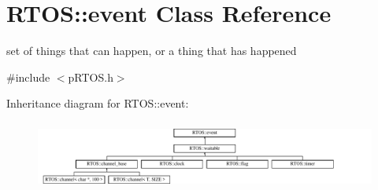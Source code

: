 \hypertarget{class_r_t_o_s_1_1event}{}\section{R\+T\+OS\+:\+:event Class Reference}
\label{class_r_t_o_s_1_1event}


set of things that can happen, or a thing that has happened  




{\ttfamily \#include $<$p\+R\+T\+O\+S.\+h$>$}

Inheritance diagram for R\+T\+OS\+:\+:event\+:\begin{figure}[H]
\begin{center}
\leavevmode
\includegraphics[height=2.285714cm]{class_r_t_o_s_1_1event}
\end{center}
\end{figure}
